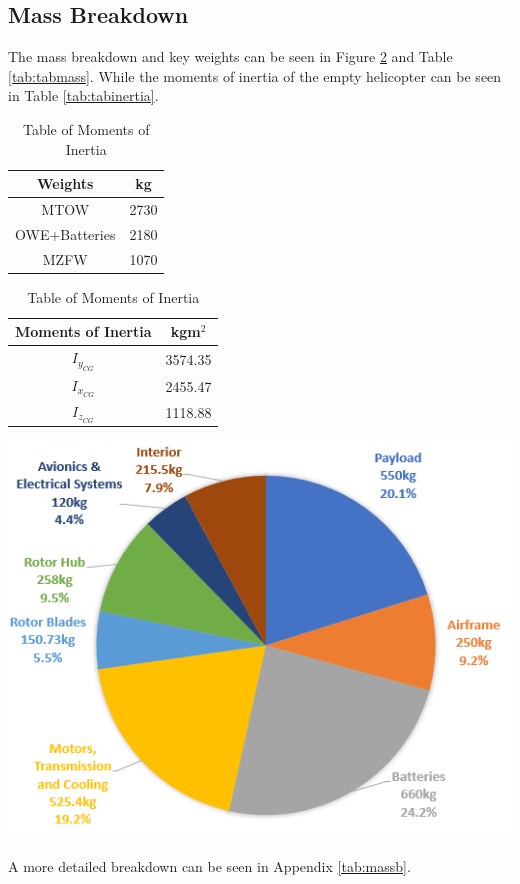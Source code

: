 \documentclass[11pt,a4paper]{article}
\begin{document}
\subsection{Mass Breakdown}
The mass breakdown and key weights can be seen in Figure \ref{fig:pie} and Table \ref{tab:tabmass}. While the moments of inertia of the empty helicopter can be seen in Table \ref{tab:tabinertia}.
\begin{table}[H]
	\begin{minipage}{0.5\linewidth}
		\caption{Table of key weights}
		\label{tab:tabmass}
		\centering
\begin{tabular}{cc}
    \hline
    \rowcolor[HTML]{DAE8FC} 
    Weights       & kg   \\ \hline
    MTOW          & 2730 \\ \hline
    OWE+Batteries & 2180 \\ \hline
    MZFW          & 1070 \\ \hline
\end{tabular}
\vspace{10pt}
\caption{Table of Moments of Inertia}
		\label{tab:tabinertia}
\begin{tabular}{cc}
\hline
\rowcolor[HTML]{DAE8FC} 
Moments of Inertia & kgm$^2$   \\ \hline
$I_{y_{CG}}$        & 3574.35 \\ \hline
$I_{x_{CG}}$        & 2455.47 \\ \hline
$I_{z_{CG}}$        & 1118.88 \\ \hline
\end{tabular}
	\end{minipage}\hfill
	\begin{minipage}{0.45\linewidth}
		\centering
		\includegraphics[width=\textwidth]{PIE.PNG}
		\label{fig:pie}
	\end{minipage}
\end{table}
A more detailed breakdown can be seen in Appendix \ref{tab:massb}.
\end{document}
